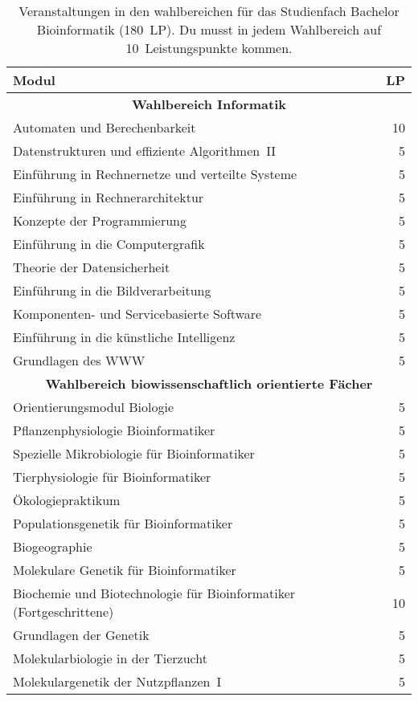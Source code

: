 \begin{table}[!th]
    \begin{small}
    \begin{tabularx}{\textwidth}{|X||r|}
        \hline
        \textbf{Modul}&\textbf{LP}\\\hline\hline
        \multicolumn{2}{|c|}{\textbf{Wahlbereich Informatik}}\\\hline
        Automaten und Berechenbarkeit&10\\\hline
        Datenstrukturen und effiziente Algorithmen~II&5\\\hline
        Einführung in Rechnernetze und verteilte Systeme&5\\\hline
        Einführung in Rechnerarchitektur&5\\\hline
        Konzepte der Programmierung&5\\\hline
        Einführung in die Computergrafik&5\\\hline
        Theorie der Datensicherheit&5\\\hline
        Einführung in die Bildverarbeitung&5\\\hline
        Komponenten- und Servicebasierte Software&5\\\hline
        Einführung in die künstliche Intelligenz&5\\\hline
        Grundlagen des WWW&5\\\hline\hline
        \multicolumn{2}{|c|}{\textbf{Wahlbereich biowissenschaftlich orientierte Fächer}}\\\hline
        Orientierungsmodul Biologie&5\\\hline
        Pflanzenphysiologie Bioinformatiker&5\\\hline
        Spezielle Mikrobiologie für Bioinformatiker&5\\\hline
        Tierphysiologie für Bioinformatiker&5\\\hline
        Ökologiepraktikum&5\\\hline
        Populationsgenetik für Bioinformatiker&5\\\hline
        Biogeographie&5\\\hline
        Molekulare Genetik für Bioinformatiker&5\\\hline
        Biochemie und Biotechnologie für Bioinformatiker (Fortgeschrittene)&10\\\hline
        Grundlagen der Genetik&5\\\hline
        Molekularbiologie in der Tierzucht&5\\\hline
        Molekulargenetik der Nutzpflanzen~I&5\\\hline
    \end{tabularx}
    \end{small}
    \caption{Veranstaltungen in den wahlbereichen für das Studienfach Bachelor Bioinformatik (180~LP). Du musst in jedem Wahlbereich auf 10~Leistungspunkte kommen.\label{plan-bioinfo2}}
\end{table}

